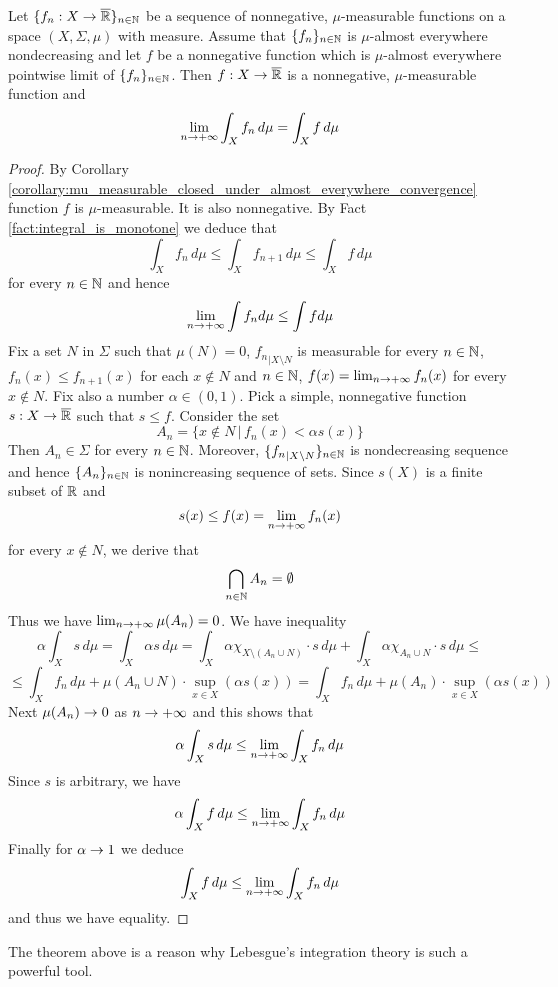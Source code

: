 \begin{theorem}\label{theorem:monotone_convergence}
Let $\{f_n:X\rightarrow \overline{{\mathbb R}}\}_{n\in {\mathbb N}}$ be a sequence of nonnegative, $\mu$-measurable functions on a space $(X,\Sigma,\mu)$ with measure. Assume that $\{f_n\}_{n\in {\mathbb N}}$ is $\mu$-almost everywhere nondecreasing and let $f$ be a nonnegative function which is $\mu$-almost everywhere pointwise limit of $\{f_n\}_{n\in {\mathbb N}}$. Then $f:X\rightarrow \overline{{\mathbb R}}$ is a nonnegative, $\mu$-measurable function and
$$\lim_{n\rightarrow +\infty}\int_X f_n\, d\mu = \int_X f\, d\mu$$
\end{theorem}
\begin{proof}
By Corollary \ref{corollary:mu_measurable_closed_under_almost_everywhere_convergence} function $f$ is $\mu$-measurable. It is also nonnegative. By Fact \ref{fact:integral_is_monotone} we deduce that
$$\int_X f_n\,d\mu \leq \int_X f_{n+1}\,d\mu \leq \int_X f\, d\mu$$
for every $n\in {\mathbb N}$ and hence 
$$\lim_{n\rightarrow +\infty}\int f_n d\mu \leq \int f d\mu$$
Fix a set $N$ in $\Sigma$ such that $\mu(N) = 0$, ${f_n}_{\mid X\setminus N}$ is measurable for every $n\in {\mathbb N}$, $f_n(x)\leq f_{n+1}(x)$ for each $x\not \in N$ and $n\in {\mathbb N}$, $f(x) = \lim_{n\rightarrow +\infty}f_n(x)$ for every $x\not \in N$. Fix also a number $\alpha \in (0,1)$. Pick a simple, nonnegative function $s:X\rightarrow \overline{{\mathbb R}}$ such that $s\leq f$. Consider the set
$$A_n = \big\{x\not \in N\,\big|\, f_n(x)< \alpha s(x)\big\}$$
Then $A_n\in \Sigma$ for every $n\in {\mathbb N}$. Moreover, $\{{f_n}_{\mid X\setminus N}\}_{n\in {\mathbb N}}$ is nondecreasing sequence and hence $\{A_n\}_{n\in {\mathbb N}}$ is nonincreasing sequence of sets. Since $s(X)$ is a finite subset of ${\mathbb R}$ and
$$s(x)\leq f(x) = \lim_{n\rightarrow +\infty}f_n(x)$$
for every $x\not \in N$, we derive that
$$\bigcap_{n\in {\mathbb N}}A_n = \emptyset$$
Thus we have $\lim_{n\rightarrow +\infty}\mu(A_n)=0$. We have inequality
$$\alpha  \int_Xs\,d\mu = \int_X\alpha s\,d\mu = \int_X \alpha \chi_{X\setminus \left(A_n\cup N\right)}\cdot s\,d\mu +  \int_X \alpha \chi_{A_n\cup N}\cdot s\,d\mu \leq $$
$$\leq \int_X f_n\,d\mu + \mu(A_n\cup N)\cdot \sup_{x\in X}\left(\alpha s(x)\right) = \int_X f_n\,d\mu + \mu(A_n)\cdot \sup_{x\in X}\left(\alpha s(x)\right)$$
Next $\mu(A_n)\rightarrow 0$ as $n\rightarrow +\infty$ and this shows that
$$\alpha  \int_Xs\,d\mu \leq \lim_{n\rightarrow +\infty}\int_Xf_n\,d\mu$$
Since $s$ is arbitrary, we have
$$\alpha  \int_Xf\,d\mu \leq \lim_{n\rightarrow +\infty}\int_Xf_n\,d\mu$$
Finally for $\alpha \rightarrow 1$ we deduce
$$\int_Xf\,d\mu \leq  \lim_{n\rightarrow +\infty}\int_Xf_n\,d\mu$$
and thus we have equality.
\end{proof}
\noindent
The theorem above is a reason why Lebesgue's integration theory is such a powerful tool.

